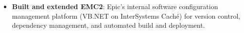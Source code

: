 \documentclass{resume}
\begin{document}
\begin{itemize}
  \item \textbf{Built and extended EMC2}: Epic's internal software configuration management platform (VB.NET on InterSystems Caché) for version control, dependency management, and automated build and deployment.

\end{itemize}
\end{document}
